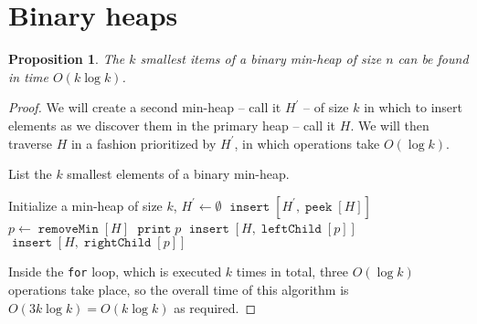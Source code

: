 \documentclass{article}
\newtheorem{proposition}{Proposition}
\DeclareMathOperator{\Peek}{\mathtt{peek}}
\DeclareMathOperator{\Insert}{\mathtt{insert}}
\DeclareMathOperator{\print}{\mathtt{print}}
\DeclareMathOperator{\leftChild}{\mathtt{leftChild}}
\DeclareMathOperator{\rightChild}{\mathtt{rightChild}}
\DeclareMathOperator{\RemoveMin}{\mathtt{removeMin}}
\begin{document}
\section{Binary heaps}

\begin{proposition}
    The $k$ smallest items of a binary min-heap of size $n$ can be found in
    time $O(k \log k)$.
\end{proposition}

\begin{proof}
    We will create a second min-heap -- call it $H^\prime$ -- of size $k$ in
    which to insert elements as we discover them in the primary heap -- call it
    $H$. We will then traverse $H$ in a fashion prioritized by $H^\prime$, in
    which operations take $O(\log{k})$.

    \begin{algorithm}
        \caption{List the $k$ smallest elements of a binary min-heap.}
        \begin{algorithmic}
                \State Initialize a min-heap of size $k$, $H^\prime \gets
                \emptyset$
                \State $\Insert{[H^\prime, \Peek{[H]}]}$
                 
                    \State $p \gets \RemoveMin{[H]}$ 
                    \State $\print{p}$
                    \State $\Insert{[H, \leftChild{[p]}]}$
                    \State $\Insert{[H, \rightChild{[p]}]}$
                \EndFor
            \EndFunction
        \end{algorithmic}
    \end{algorithm}

    Inside the \texttt{for} loop, which is executed $k$ times in total, three
    $O(\log k)$ operations take place, so the overall time of this algorithm is
    $O(3k\log k) = O(k\log k)$ as required.
\end{proof}
\end{document}
